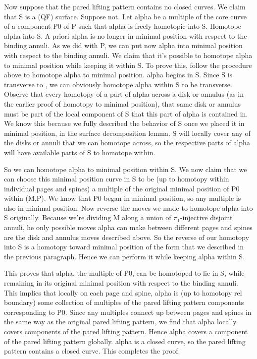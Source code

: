 Now suppose that the pared lifting pattern contains no closed curves. We claim
that S is a (QF) surface. Suppose not. Let alpha be a multiple of the core
curve of a component P0 of P such that alpha is freely homotopic into S.
Homotope alpha into S. A priori alpha is no longer in minimal position with
respect to the binding annuli. As we did with P, we can put now alpha into
minimal position with respect to the binding annuli.  We claim that it's
possible to homotope alpha to minimal position while keeping it within S.  To
prove this, follow the procedure above to homotope alpha to minimal position.
alpha begins in S.  Since S is transverse to \cA, we can obviously homotope
alpha within S to be transverse.  Observe that every homotopy of a part of
alpha across a disk or annulus (as in the earlier proof of homotopy to minimal
position), that same disk or annulus must be part of the local component of
S that this part of alpha is contained in. We know this because we fully
described the behavior of S once we placed it in minimal position, in the
surface decomposition lemma.  S will locally cover any of the disks or annuli
that we can homotope across, so the respective parts of alpha will have
available parts of S to homotope within.

So we can homotope alpha to minimal position within S. We now claim that we can
choose this minimal position curve in S to be (up to homotopy within individual
pages and spines) a multiple of the original minimal position of P0 within
(M,P). We know that P0 began in minimal position, so any multiple is also in
minimal position. Now reverse the moves we made to homotope alpha into
S originally. Because we're dividing M along a union of $\pi_1$-injective disjoint
annuli, he only possible moves alpha can make between different pages and
spines are the disk and annulus moves described above. So the reverse of our
homotopy into S is a homotopy toward minimal position of the form that we
described in the previous paragraph. Hence we can perform it while keeping
alpha within S.

This proves that alpha, the multiple of P0, can be homotoped to lie in S, while
remaining in its original minimal position with respect to the binding annuli.
This implies that locally on each page and spine, alpha is (up to homotopy rel
boundary) some collection of multiples of the pared lifting pattern components
corresponding to P0. Since any multiples connect up between pages and spines in
the same way as the original pared lifting pattern, we find that alpha locally
covers components of the pared lifting pattern. Hence alpha covers a component
of the pared lifting pattern globally. alpha is a closed curve, so the pared
lifting pattern contains a closed curve. This completes the proof.

